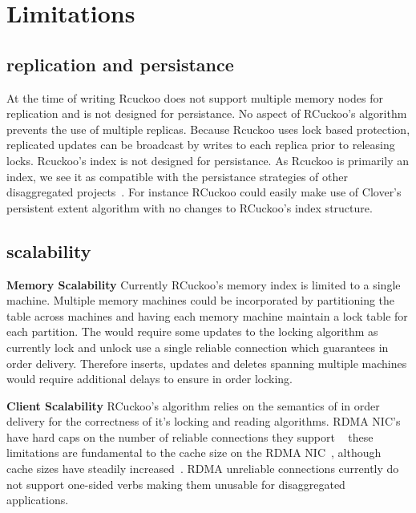 \section{Limitations}
\label{sec:limations}

\subsection{replication and persistance} At the time of
writing Rcuckoo does not support multiple memory nodes for
replication and is not designed for persistance. No aspect
of RCuckoo's algorithm prevents the use of multiple
replicas. Because Rcuckoo uses lock based protection,
replicated updates can be broadcast by writes to each
replica prior to releasing locks. Rcuckoo's index is not
designed for persistance. As Rcuckoo is primarily an index,
we see it as compatible with the persistance strategies of
other disaggregated projects~\cite{clover}. For instance
RCuckoo could easily make use of Clover's persistent extent
algorithm with no changes to RCuckoo's index structure.

\subsection{scalability} 
\textbf{Memory Scalability} Currently RCuckoo's memory index
is limited to a single machine. Multiple memory machines
could be incorporated by partitioning the table across
machines and having each memory machine maintain a lock
table for each partition. The would require some updates to
the locking algorithm as currently lock and unlock use a
single reliable connection which guarantees in order
delivery. Therefore inserts, updates and deletes spanning
multiple machines would require additional delays to ensure
in order locking.

\textbf{Client Scalability} RCuckoo's algorithm relies
on the semantics of in order delivery for the correctness of
it's locking and reading algorithms. RDMA NIC's have hard
caps on the number of reliable connections they support
~ these limitations are fundamental to the
cache size on the RDMA NIC~\cite{erpc,faast}, although cache
sizes have steadily increased~\cite{storm}. RDMA unreliable
connections currently do not support one-sided verbs making
them unusable for disaggregated applications.

